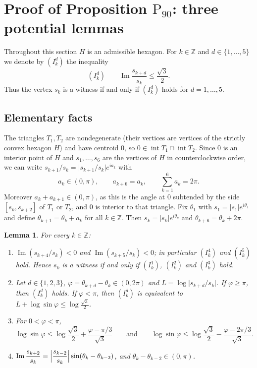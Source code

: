 \documentclass[11pt]{amsart}
\newtheorem{lemma}[theorem]{Lemma}
\theoremstyle{definition}
\theoremstyle{remark}
\newcommand{\Z}{\mathbb{Z}}
\renewcommand{\Im}{\operatorname{Im}}
\newcommand{\Pn}{\mathrm{P}_{90}}
\newcommand{\sq}{\tfrac{\sqrt3}{2}}
\begin{document}
\section{Proof of Proposition \texorpdfstring{$\Pn$}{P90}: three potential lemmas}\label{sec:lemmas}

Throughout this section $H$ is an admissible hexagon. For $k\in\Z$ and $d\in\{1,\dots,5\}$ we denote by $(I^d_k)$ the inequality
\[
(I^d_k)\qquad \Im\frac{s_{k+d}}{s_k}\le\frac{\sqrt3}{2}.
\]
Thus the vertex $s_k$ is a witness if and only if $(I^d_k)$ holds for $d=1,\dots,5$.

\subsection{Elementary facts}
The triangles $T_1,T_2$ are nondegenerate (their vertices are vertices of the strictly convex hexagon $H$) and have centroid $0$, so $0\in\operatorname{int}T_1\cap\operatorname{int}T_2$. Since $0$ is an interior point of $H$ and $s_1,\dots,s_6$ are the vertices of $H$ in counterclockwise order, we can write $s_{k+1}/s_k=\lvert s_{k+1}/s_k\rvert e^{ia_k}$ with
\[
a_k\in(0,\pi),\qquad a_{k+6}=a_k,\qquad \sum_{k=1}^6a_k=2\pi .
\]
Moreover $a_k+a_{k+1}\in(0,\pi)$, as this is the angle at $0$ subtended by the side $[s_k,s_{k+2}]$ of $T_1$ or $T_2$, and $0$ is interior to that triangle. Fix $\theta_1$ with $s_1=\lvert s_1\rvert e^{i\theta_1}$ and define $\theta_{k+1}=\theta_k+a_k$ for all $k\in\Z$. Then $s_k=\lvert s_k\rvert e^{i\theta_k}$ and $\theta_{k+6}=\theta_k+2\pi$.

\begin{lemma}\label{lem:facts}
For every $k\in\Z$:
\begin{enumerate}[label=\textup{(\alph*)}]
\item $\Im(s_{k+4}/s_k)<0$ and $\Im(s_{k+5}/s_k)<0$; in particular $(I^4_k)$ and $(I^5_k)$ hold. Hence $s_k$ is a witness if and only if $(I^1_k)$, $(I^2_k)$ and $(I^3_k)$ hold.
\item Let $d\in\{1,2,3\}$, $\varphi=\theta_{k+d}-\theta_k\in(0,2\pi)$ and $L=\log\lvert s_{k+d}/s_k\rvert$. If $\varphi\ge\pi$, then $(I^d_k)$ holds. If $\varphi<\pi$, then $(I^d_k)$ is equivalent to $L+\log\sin\varphi\le\log\sq$.
\item For $0<\varphi<\pi$,
\begin{equation}\label{eq:tangent}
\log\sin\varphi\le\log\frac{\sqrt3}{2}+\frac{\varphi-\pi/3}{\sqrt3}
\qquad\text{and}\qquad
\log\sin\varphi\le\log\frac{\sqrt3}{2}-\frac{\varphi-2\pi/3}{\sqrt3}.
\end{equation}
\item $\displaystyle\Im\frac{s_{k+2}}{s_k}=\Bigl\lvert\frac{s_{k-2}}{s_k}\Bigr\rvert\sin(\theta_k-\theta_{k-2})$, and $\theta_k-\theta_{k-2}\in(0,\pi)$.
\end{enumerate}
\end{lemma}
\end{document}
